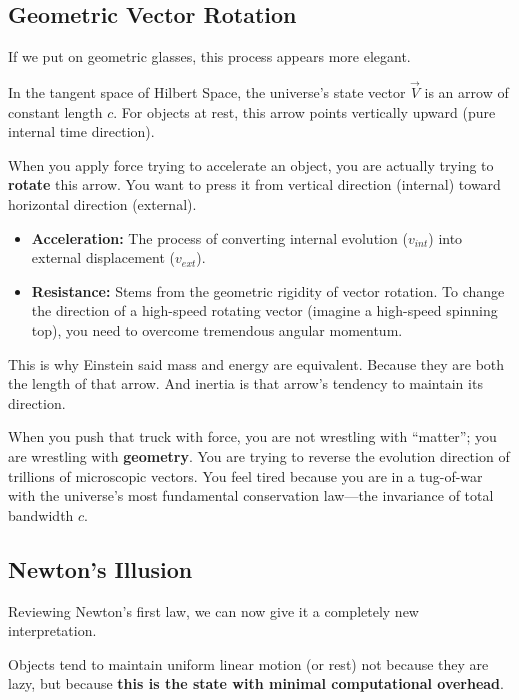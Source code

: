 \documentclass[11pt,a4paper,twoside]{book}
\begin{document}
\subsection{Geometric Vector Rotation}

If we put on geometric glasses, this process appears more elegant.

In the tangent space of Hilbert Space, the universe's state vector $\vec{V}$ is an arrow of constant length $c$. For objects at rest, this arrow points vertically upward (pure internal time direction).

When you apply force trying to accelerate an object, you are actually trying to \textbf{rotate} this arrow. You want to press it from vertical direction (internal) toward horizontal direction (external).

\begin{itemize}
\item \textbf{Acceleration:} The process of converting internal evolution ($v_{int}$) into external displacement ($v_{ext}$).

\item \textbf{Resistance:} Stems from the geometric rigidity of vector rotation. To change the direction of a high-speed rotating vector (imagine a high-speed spinning top), you need to overcome tremendous angular momentum.
\end{itemize}

This is why Einstein said mass and energy are equivalent. Because they are both the length of that arrow. And inertia is that arrow's tendency to maintain its direction.

When you push that truck with force, you are not wrestling with ``matter''; you are wrestling with \textbf{geometry}. You are trying to reverse the evolution direction of trillions of microscopic vectors. You feel tired because you are in a tug-of-war with the universe's most fundamental conservation law---the invariance of total bandwidth $c$.

\subsection{Newton's Illusion}

Reviewing Newton's first law, we can now give it a completely new interpretation.

Objects tend to maintain uniform linear motion (or rest) not because they are lazy, but because \textbf{this is the state with minimal computational overhead}.
\end{document}
